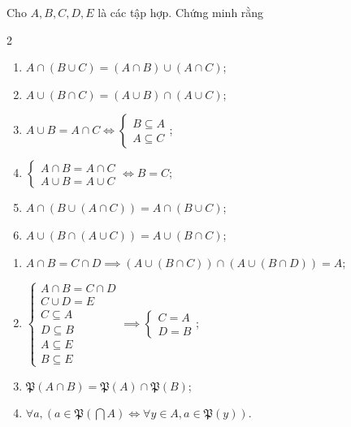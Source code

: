 \exercise Cho $A, B, C, D, E$ là các tập hợp. Chứng minh rằng
\begin{multicols}{2}
   \begin{enumerate}
      \item $A \cap (B \cup C) = (A \cap B) \cup (A \cap C)$;
      \item $A \cup (B \cap C) = (A \cup B) \cap (A \cup C)$;
      \item $A \cup B = A \cap C \iff \begin{cases}
         B \subseteq A \\
         A \subseteq C
      \end{cases}$;
      \item $\begin{cases}
         A \cap B = A \cap C \\
         A \cup B = A \cup C
      \end{cases} \iff B = C$;
      \item $A \cap (B \cup (A \cap C)) = A \cap (B \cup C)$;
      \item $A \cup (B \cap (A \cup C)) = A \cup (B \cap C)$;
      \setcounter{subexercise}{\value{enumi}}
   \end{enumerate}
\end{multicols}
\begin{enumerate}
   \setcounter{enumi}{\value{subexercise}}
   \item $A \cap B = C \cap D \implies (A \cup (B \cap C)) \cap (A \cup (B \cap D)) = A$;
   \item $\begin{cases}
      A \cap B = C\cap D\\
      C \cup D = E \\
      C \subseteq A \\
      D \subseteq B \\
      A \subseteq E \\
      B \subseteq E
   \end{cases} \implies \begin{cases}
      C = A\\
      D = B
   \end{cases}$;
   \item $\mathfrak{P}(A \cap B) = \mathfrak{P}(A) \cap \mathfrak{P}(B)$;
   \item $\forall a, \left(a \in \mathfrak{P}\left(\bigcap A\right) \iff \forall y \in A, a \in \mathfrak{P}(y)\right)$.
\end{enumerate}

\solution

